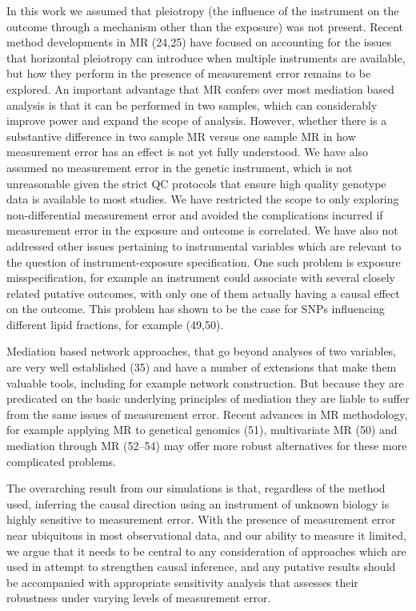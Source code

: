 \documentclass[]{article}
\begin{document}
In this work we assumed that pleiotropy (the influence of the instrument
on the outcome through a mechanism other than the exposure) was not
present. Recent method developments in MR (24,25) have focused on
accounting for the issues that horizontal pleiotropy can introduce when
multiple instruments are available, but how they perform in the presence
of measurement error remains to be explored. An important advantage that
MR confers over most mediation based analysis is that it can be
performed in two samples, which can considerably improve power and
expand the scope of analysis. However, whether there is a substantive
difference in two sample MR versus one sample MR in how measurement
error has an effect is not yet fully understood. We have also assumed no
measurement error in the genetic instrument, which is not unreasonable
given the strict QC protocols that ensure high quality genotype data is
available to most studies. We have restricted the scope to only
exploring non-differential measurement error and avoided the
complications incurred if measurement error in the exposure and outcome
is correlated. We have also not addressed other issues pertaining to
instrumental variables which are relevant to the question of
instrument-exposure specification. One such problem is exposure
misspecification, for example an instrument could associate with several
closely related putative outcomes, with only one of them actually having
a causal effect on the outcome. This problem has shown to be the case
for SNPs influencing different lipid fractions, for example (49,50).

Mediation based network approaches, that go beyond analyses of two
variables, are very well established (35) and have a number of
extensions that make them valuable tools, including for example network
construction. But because they are predicated on the basic underlying
principles of mediation they are liable to suffer from the same issues
of measurement error. Recent advances in MR methodology, for example
applying MR to genetical genomics (51), multivariate MR (50) and
mediation through MR (52--54) may offer more robust alternatives for
these more complicated problems.

The overarching result from our simulations is that, regardless of the
method used, inferring the causal direction using an instrument of
unknown biology is highly sensitive to measurement error. With the
presence of measurement error near ubiquitous in most observational
data, and our ability to measure it limited, we argue that it needs to
be central to any consideration of approaches which are used in attempt
to strengthen causal inference, and any putative results should be
accompanied with appropriate sensitivity analysis that assesses their
robustness under varying levels of measurement error.
\end{document}
